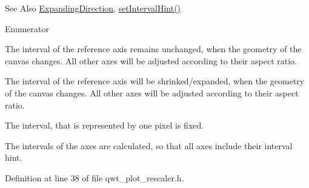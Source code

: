 \begin{DoxySeeAlso}{See Also}
\hyperlink{class_qwt_plot_rescaler_a1c314e9513cef076a79381111aa67585}{Expanding\-Direction}, \hyperlink{class_qwt_plot_rescaler_afefb0ec065ff855785d0198fc04a07d3}{set\-Interval\-Hint()} 
\end{DoxySeeAlso}
\begin{Desc}
\item[Enumerator]\par
\begin{description}
\item[{\em 
\hypertarget{class_qwt_plot_rescaler_a6a614b832876a7641cb5410ba81d9d6aab8f9ce10c092bee12de74b05a46b6e9c}{Fixed}\label{class_qwt_plot_rescaler_a6a614b832876a7641cb5410ba81d9d6aab8f9ce10c092bee12de74b05a46b6e9c}
}]The interval of the reference axis remains unchanged, when the geometry of the canvas changes. All other axes will be adjusted according to their aspect ratio. \item[{\em 
\hypertarget{class_qwt_plot_rescaler_a6a614b832876a7641cb5410ba81d9d6aac0b9db1ea3c5666792c2a9813ca5d7e1}{Expanding}\label{class_qwt_plot_rescaler_a6a614b832876a7641cb5410ba81d9d6aac0b9db1ea3c5666792c2a9813ca5d7e1}
}]The interval of the reference axis will be shrinked/expanded, when the geometry of the canvas changes. All other axes will be adjusted according to their aspect ratio.

The interval, that is represented by one pixel is fixed. \item[{\em 
\hypertarget{class_qwt_plot_rescaler_a6a614b832876a7641cb5410ba81d9d6aa30a43b11d9df23f66110b65d1e249db1}{Fitting}\label{class_qwt_plot_rescaler_a6a614b832876a7641cb5410ba81d9d6aa30a43b11d9df23f66110b65d1e249db1}
}]The intervals of the axes are calculated, so that all axes include their interval hint. \end{description}
\end{Desc}


Definition at line 38 of file qwt\-\_\-plot\-\_\-rescaler.\-h.



